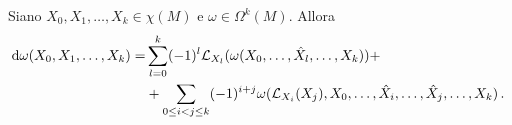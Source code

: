 \begin{proposition} \label{prop:DeForma}
	Siano $X_0,X_1,\ldots,X_k\in\chi(M)$ e $\omega \in \Omega^k(M)$. Allora
	\begin{align*}
		\,\mathrm d \omega (X_0,X_1,\ldots,X_k) =& \sum_{l=0}^k (-1)^l\mathcal L_{X_l}(\omega(X_0,\ldots, \hat X_l, \ldots, X_k)) + \\
		&+\sum_{0\le i<j\le k}(-1)^{i+j} \omega (\mathcal L_{X_i}(X_j),X_0,\ldots,\hat X_i,\ldots, \hat X_j,\ldots, X_k) \, \text{. }
	\end{align*}

\end{proposition}
